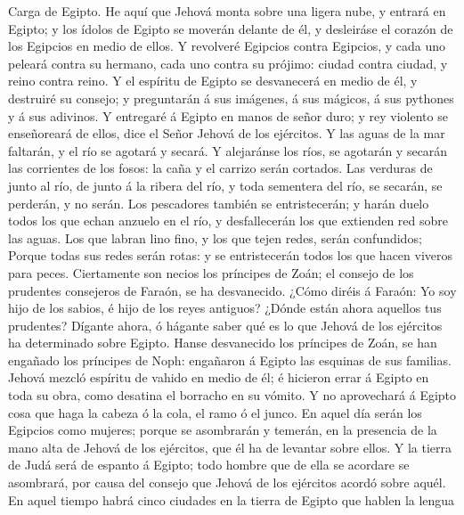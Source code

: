  Carga de Egipto. He aquí que Jehová monta sobre una
ligera nube, y entrará en Egipto; y los ídolos de Egipto se moverán
delante de él, y desleiráse el corazón de los Egipcios en medio de
ellos.  Y revolveré Egipcios contra Egipcios, y cada uno
peleará contra su hermano, cada uno contra su prójimo: ciudad contra
ciudad, y reino contra reino.  Y el espíritu de Egipto se
desvanecerá en medio de él, y destruiré su consejo; y preguntarán á sus
imágenes, á sus mágicos, á sus pythones y á sus adivinos. 
Y entregaré á Egipto en manos de señor duro; y rey violento se
enseñoreará de ellos, dice el Señor Jehová de los ejércitos.
 Y las aguas de la mar faltarán, y el río se agotará y
secará.  Y alejaránse los ríos, se agotarán y secarán las
corrientes de los fosos: la caña y el carrizo serán cortados.
 Las verduras de junto al río, de junto á la ribera del
río, y toda sementera del río, se secarán, se perderán, y no serán.
 Los pescadores también se entristecerán; y harán duelo
todos los que echan anzuelo en el río, y desfallecerán los que extienden
red sobre las aguas.  Los que labran lino fino, y los que
tejen redes, serán confundidos;  Porque todas sus redes
serán rotas: y se entristecerán todos los que hacen viveros para peces.
 Ciertamente son necios los príncipes de Zoán; el consejo
de los prudentes consejeros de Faraón, se ha desvanecido. ¿Cómo diréis á
Faraón: Yo soy hijo de los sabios, é hijo de los reyes antiguos?
 ¿Dónde están ahora aquellos tus prudentes? Dígante
ahora, ó hágante saber qué es lo que Jehová de los ejércitos ha
determinado sobre Egipto.  Hanse desvanecido los
príncipes de Zoán, se han engañado los príncipes de Noph: engañaron á
Egipto las esquinas de sus familias.  Jehová mezcló
espíritu de vahido en medio de él; é hicieron errar á Egipto en toda su
obra, como desatina el borracho en su vómito.  Y no
aprovechará á Egipto cosa que haga la cabeza ó la cola, el ramo ó el
junco.  En aquel día serán los Egipcios como mujeres;
porque se asombrarán y temerán, en la presencia de la mano alta de
Jehová de los ejércitos, que él ha de levantar sobre ellos.
 Y la tierra de Judá será de espanto á Egipto; todo
hombre que de ella se acordare se asombrará, por causa del consejo que
Jehová de los ejércitos acordó sobre aquél.  En aquel
tiempo habrá cinco ciudades en la tierra de Egipto que hablen la lengua

